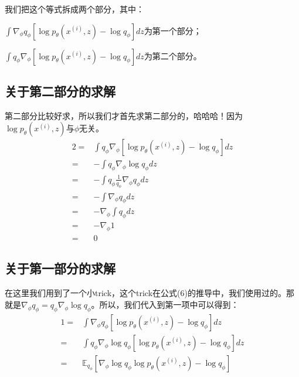 \documentclass[a4paper]{article}
\begin{document}
我们把这个等式拆成两个部分，其中：

$\int \nabla_{\phi} q_{\phi}\left[ \log p_{\theta}(x^{(i)},z) - \log q_{\phi} \right]dz$为第一个部分；

$ \int q_{\phi}\nabla_{\phi} \left[ \log p_{\theta}(x^{(i)},z) - \log q_{\phi} \right]dz$为第二个部分。

\subsection{关于第二部分的求解}
第二部分比较好求，所以我们才首先求第二部分的，哈哈哈！因为$\log p_{\theta}(x^{(i)},z)$与$\phi$无关。
\begin{equation}
    \begin{split}
        2 
        = & \int q_{\phi}\nabla_{\phi} \left[ \log p_{\theta}(x^{(i)},z) - \log q_{\phi} \right]dz \\
        = & -\int q_{\phi}\nabla_{\phi}\log q_{\phi} dz \\
        = & -\int q_{\phi} \frac{1}{q_{\phi}}\nabla_{\phi} q_{\phi} dz \\
        = & -\int \nabla_{\phi} q_{\phi} dz \\
        = & - \nabla_{\phi} \int q_{\phi} dz \\
        = & - \nabla_{\phi} 1 \\
        = & 0
    \end{split}
\end{equation}

\subsection{关于第一部分的求解}
在这里我们用到了一个小trick，这个trick在公式(6)的推导中，我们使用过的。那就是$\nabla_{\phi} q_{\phi} = q_{\phi}\nabla_{\phi}\log q_{\phi} $。所以，我们代入到第一项中可以得到：
\begin{equation}
    \begin{split}
        1 
        = & \int \nabla_{\phi} q_{\phi}\left[ \log p_{\theta}(x^{(i)},z) - \log q_{\phi} \right]dz \\
        = & \int q_{\phi}\nabla_{\phi}\log q_{\phi} \left[ \log p_{\theta}(x^{(i)},z) - \log q_{\phi} \right]dz \\
        = & \mathbb{E}_{q_{\phi}} \left[ \nabla_{\phi}\log q_{\phi} \log p_{\theta}(x^{(i)},z) - \log q_{\phi} \right] 
    \end{split}
\end{equation}
\end{document}
